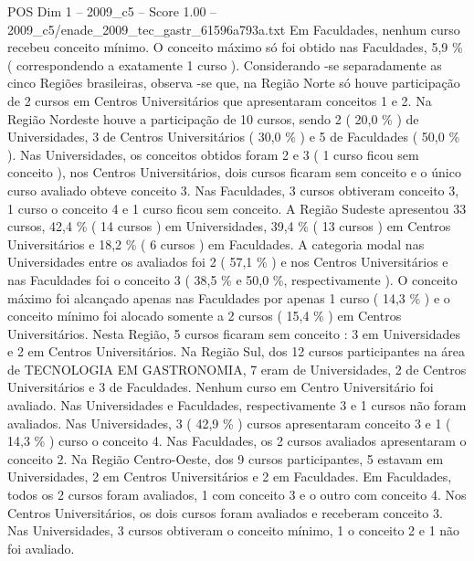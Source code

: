 \begin{textsample}{POS Dim 1 – 2009\_c5 – Score 1.00 – 2009\_c5/enade\_2009\_tec\_gastr\_61596a793a.txt}
Em Faculdades, nenhum curso recebeu conceito mínimo.
O conceito máximo só foi obtido nas Faculdades, 5,9 \% ( correspondendo a exatamente 1 curso ).
Considerando -se separadamente as cinco Regiões brasileiras, observa -se que, na Região Norte só houve participação de 2 cursos em Centros Universitários que apresentaram conceitos 1 e 2.
Na Região Nordeste houve a participação de 10 cursos, sendo 2 ( 20,0 \% ) de Universidades, 3 de Centros Universitários ( 30,0 \% ) e 5 de Faculdades ( 50,0 \% ).
Nas Universidades, os conceitos obtidos foram 2 e 3 ( 1 curso ficou sem conceito ), nos Centros Universitários, dois cursos ficaram sem conceito e o único curso avaliado obteve conceito 3.
Nas Faculdades, 3 cursos obtiveram conceito 3, 1 curso o conceito 4 e 1 curso ficou sem conceito.
A Região Sudeste apresentou 33 cursos, 42,4 \% ( 14 cursos ) em Universidades, 39,4 \% ( 13 cursos ) em Centros Universitários e 18,2 \% ( 6 cursos ) em Faculdades.
A categoria modal nas Universidades entre os avaliados foi 2 ( 57,1 \% ) e nos Centros Universitários e nas Faculdades foi o conceito 3 ( 38,5 \% e 50,0 \%, respectivamente ).
O conceito máximo foi alcançado apenas nas Faculdades por apenas 1 curso ( 14,3 \% ) e o conceito mínimo foi alocado somente a 2 cursos ( 15,4 \% ) em Centros Universitários.
Nesta Região, 5 cursos ficaram sem conceito : 3 em Universidades e 2 em Centros Universitários.
Na Região Sul, dos 12 cursos participantes na área de TECNOLOGIA EM GASTRONOMIA, 7 eram de Universidades, 2 de Centros Universitários e 3 de Faculdades.
Nenhum curso em Centro Universitário foi avaliado.
Nas Universidades e Faculdades, respectivamente 3 e 1 cursos não foram avaliados.
Nas Universidades, 3 ( 42,9 \% ) cursos apresentaram conceito 3 e 1 ( 14,3 \% ) curso o conceito 4.
Nas Faculdades, os 2 cursos avaliados apresentaram o conceito 2.
Na Região Centro-Oeste, dos 9 cursos participantes, 5 estavam em Universidades, 2 em Centros Universitários e 2 em Faculdades.
Em Faculdades, todos os 2 cursos foram avaliados, 1 com conceito 3 e o outro com conceito 4.
Nos Centros Universitários, os dois cursos foram avaliados e receberam conceito 3.
Nas Universidades, 3 cursos obtiveram o conceito mínimo, 1 o conceito 2 e 1 não foi avaliado.

\end{textsample}
